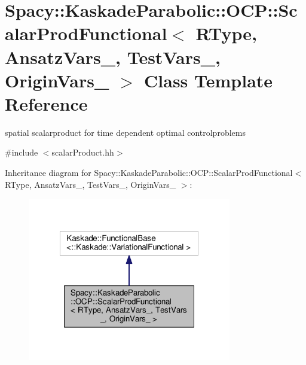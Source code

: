 \hypertarget{classSpacy_1_1KaskadeParabolic_1_1OCP_1_1ScalarProdFunctional}{\section{Spacy\-:\-:Kaskade\-Parabolic\-:\-:O\-C\-P\-:\-:Scalar\-Prod\-Functional$<$ R\-Type, Ansatz\-Vars\-\_\-, Test\-Vars\-\_\-, Origin\-Vars\-\_\- $>$ Class Template Reference}
\label{classSpacy_1_1KaskadeParabolic_1_1OCP_1_1ScalarProdFunctional}
}


spatial scalarproduct for time dependent optimal controlproblems  




{\ttfamily \#include $<$scalar\-Product.\-hh$>$}



Inheritance diagram for Spacy\-:\-:Kaskade\-Parabolic\-:\-:O\-C\-P\-:\-:Scalar\-Prod\-Functional$<$ R\-Type, Ansatz\-Vars\-\_\-, Test\-Vars\-\_\-, Origin\-Vars\-\_\- $>$\-:
\nopagebreak
\begin{figure}[H]
\begin{center}
\leavevmode
\includegraphics[width=252pt]{classSpacy_1_1KaskadeParabolic_1_1OCP_1_1ScalarProdFunctional__inherit__graph}
\end{center}
\end{figure}


